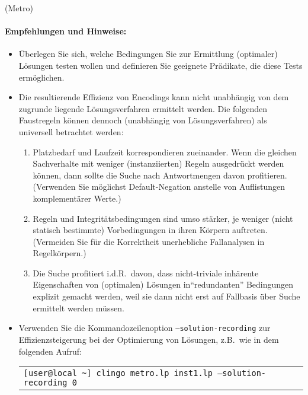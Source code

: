 \documentclass[a4paper,12pt,ngerman]{article}
\begin{document}
\begin{PraktikumsAufgabe}{2}{(Metro)}
\paragraph{Empfehlungen und Hinweise:}\vspace{-2mm}
\begin{itemize}
\item Überlegen Sie sich, welche Bedingungen Sie zur Ermittlung (optimaler) L\"osungen
      testen wollen und definieren Sie geeignete Pr\"adikate, die diese Tests erm\"oglichen.
\item Die resultierende Effizienz von Encodings kann nicht unabhängig von dem
      zugrunde liegende Lösungsverfahren ermittelt werden.
      Die folgenden Faustregeln können dennoch  (unabhängig von Lösungsverfahren) als universell betrachtet werden:
      \vspace{-3mm}
      \begin{enumerate}\itemsep-1.5pt
      \item Platzbedarf und Laufzeit korrespondieren zueinander.
            Wenn die gleichen Sachverhalte mit weniger (instanziierten) Regeln ausgedrückt werden können,
            dann sollte die Suche nach Antwortmengen davon profitieren.
            (Verwenden Sie möglichst Default-Negation anstelle von Auflistungen komplementärer Werte.)
      \item Regeln und Integritätsbedingungen sind umso stärker, je weniger (nicht statisch bestimmte)
            Vorbedingungen in ihren Körpern auftreten.
            (Vermeiden Sie für die Korrektheit unerhebliche Fallanalysen in Regelkörpern.)
      \item Die Suche profitiert i.d.R.\ davon, dass nicht-triviale inhärente Eigenschaften von (optimalen)
            Lösungen in``redundanten'' Bedingungen explizit gemacht werden, weil sie dann nicht
            erst auf Fallbasis über Suche ermittelt werden müssen.
      \end{enumerate}
      \vspace{-3mm}
\item Verwenden Sie die Kommandozeilenoption \texttt{--solution-recording} zur
      Effizienz\-steigerung bei der Optimierung von L\"osungen, z.B.\ wie in dem folgenden Aufruf:\newline
\begin{tabular}{@{}l}%
\texttt{[user@local \textasciitilde] clingo metro.lp inst1.lp --solution-recording 0}

\end{tabular}
\end{itemize}
\end{PraktikumsAufgabe}
\end{document}
